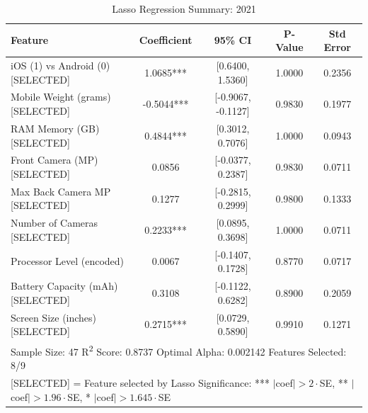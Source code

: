 \documentclass[12pt]{article}
\begin{document}
\begin{table}[ht]
\centering
\caption{Lasso Regression Summary: 2021}
\begin{tabular}{lcccc}
\toprule
Feature & Coefficient & 95\% CI & P-Value & Std Error \\
\midrule
iOS (1) vs Android (0) [SELECTED] & 1.0685*** & {[0.6400, 1.5360]} & 1.0000 & 0.2356 \\
Mobile Weight (grams) [SELECTED] & -0.5044*** & {[-0.9067, -0.1127]} & 0.9830 & 0.1977 \\
RAM Memory (GB) [SELECTED] & 0.4844*** & {[0.3012, 0.7076]} & 1.0000 & 0.0943 \\
Front Camera (MP) [SELECTED] & 0.0856 & {[-0.0377, 0.2387]} & 0.9830 & 0.0711 \\
Max Back Camera MP [SELECTED] & 0.1277 & {[-0.2815, 0.2999]} & 0.9800 & 0.1333 \\
Number of Cameras [SELECTED] & 0.2233*** & {[0.0895, 0.3698]} & 1.0000 & 0.0711 \\
Processor Level (encoded) & 0.0067 & {[-0.1407, 0.1728]} & 0.8770 & 0.0717 \\
Battery Capacity (mAh) [SELECTED] & 0.3108 & {[-0.1122, 0.6282]} & 0.8900 & 0.2059 \\
Screen Size (inches) [SELECTED] & 0.2715*** & {[0.0729, 0.5890]} & 0.9910 & 0.1271 \\
\midrule
\multicolumn{5}{l}{\footnotesize Sample Size: 47 \quad R\textsuperscript{2} Score: 0.8737 \quad Optimal Alpha: 0.002142 \quad Features Selected: 8/9} \\
\multicolumn{5}{l}{\footnotesize [SELECTED] = Feature selected by Lasso \quad Significance: *** $|$coef$|>2\cdot$SE, ** $|$coef$|>1.96\cdot$SE, * $|$coef$|>1.645\cdot$SE} \\
\bottomrule
\end{tabular}
\end{table}
\end{document}
